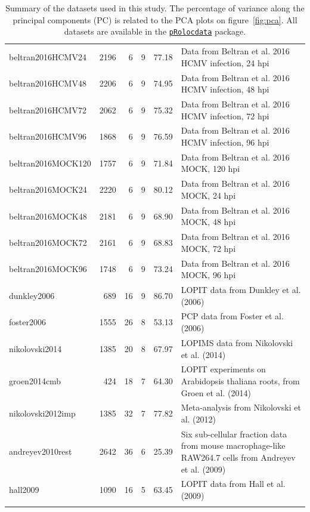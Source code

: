 \documentclass[12pt]{article}\usepackage[]{graphicx}\usepackage[]{color}
\newcommand{\Rpackage}[1]{\texttt{#1}}
\newcommand\Biocpkg[1]{%
  {\href{http://bioconductor.org/packages/#1}%
    {\Rpackage{#1}}}}
\newcommand\Biocexptpkg[1]{\Biocpkg{#1}}
\begin{document}
\begin{footnotesize}
\begin{landscape}
\begin{longtable}{lrrrrp{8cm}}
  beltran2016HCMV24 & 2196 &   6 &   9 & 77.18 & Data from Beltran et al. 2016 \citep{JeanBeltran:2016} HCMV infection, 24 hpi \\ 
  beltran2016HCMV48 & 2206 &   6 &   9 & 74.95 & Data from Beltran et al. 2016 \citep{JeanBeltran:2016} HCMV infection, 48 hpi \\ 
  beltran2016HCMV72 & 2062 &   6 &   9 & 75.32 & Data from Beltran et al. 2016 \citep{JeanBeltran:2016} HCMV infection, 72 hpi \\ 
  beltran2016HCMV96 & 1868 &   6 &   9 & 76.59 & Data from Beltran et al. 2016 \citep{JeanBeltran:2016} HCMV infection, 96 hpi \\ 
  beltran2016MOCK120 & 1757 &   6 &   9 & 71.84 & Data from Beltran et al. 2016 \citep{JeanBeltran:2016} MOCK, 120 hpi \\ 
  beltran2016MOCK24 & 2220 &   6 &   9 & 80.12 & Data from Beltran et al. 2016 \citep{JeanBeltran:2016} MOCK, 24 hpi \\ 
  beltran2016MOCK48 & 2181 &   6 &   9 & 68.90 & Data from Beltran et al. 2016 \citep{JeanBeltran:2016} MOCK, 48 hpi \\ 
  beltran2016MOCK72 & 2161 &   6 &   9 & 68.83 & Data from Beltran et al. 2016 \citep{JeanBeltran:2016} MOCK, 72 hpi \\ 
  beltran2016MOCK96 & 1748 &   6 &   9 & 73.24 & Data from Beltran et al. 2016 \citep{JeanBeltran:2016} MOCK, 96 hpi \\ 
  dunkley2006 & 689 &  16 &   9 & 86.70 & LOPIT data from Dunkley et al. (2006) \citep{Dunkley:2006} \\ 
  foster2006 & 1555 &  26 &   8 & 53.13 & PCP data from Foster et al. (2006) \citep{Foster:2006} \\ 
  nikolovski2014 & 1385 &  20 &   8 & 67.97 & LOPIMS data from Nikolovski et al. (2014) \citep{Nikolovski:2014} \\ 
  groen2014cmb & 424 &  18 &   7 & 64.30 & LOPIT experiments on Arabidopsis thaliana roots, from Groen et al. (2014) \citep{Groen:2014} \\ 
  nikolovski2012imp & 1385 &  32 &   7 & 77.82 & Meta-analysis from Nikolovski et al. (2012) \citep{Nikolovski:2012} \\ 
  andreyev2010rest & 2642 &  36 &   6 & 25.39 & Six sub-cellular fraction data from mouse macrophage-like RAW264.7 cells from Andreyev et al. (2009) \citep{Andreyev:2010} \\ 
  hall2009 & 1090 &  16 &   5 & 63.45 & LOPIT data from Hall et al. (2009) \citep{Hall:2009} \\ 
   \bottomrule
\caption{Summary of the datasets used in this study. The percentage of variance along the principal components (PC) is related to the PCA plots on figure~\ref{fig:pca}. All datasets are available in the \Biocexptpkg{pRolocdata} package.} 
\label{tab:pdtab}
\end{longtable}

\end{landscape}
\end{footnotesize}
\end{document}
